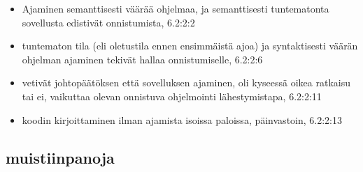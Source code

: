 \documentclass[finnish,twoside,openright]{HYgraduMLDS}
\begin{document}
\begin{itemize}
\begin{itemize}
\begin{itemize}
        \end{itemize}
        \item Ajaminen semanttisesti väärää ohjelmaa, ja semanttisesti tuntematonta sovellusta edistivät onnistumista, 6.2:2:2
        \item tuntematon tila (eli oletustila ennen ensimmäistä ajoa) ja syntaktisesti väärän ohjelman ajaminen tekivät hallaa onnistumiselle, 6.2:2:6
        \item vetivät johtopäätöksen että sovelluksen ajaminen, oli kyseessä oikea ratkaisu tai ei, vaikuttaa olevan onnistuva ohjelmointi lähestymistapa, 6.2:2:11
        \item koodin kirjoittaminen ilman ajamista isoissa paloissa, päinvastoin, 6.2:2:13
    \end{itemize}
\end{itemize} 


\subsection{muistiinpanoja}
\end{document}
